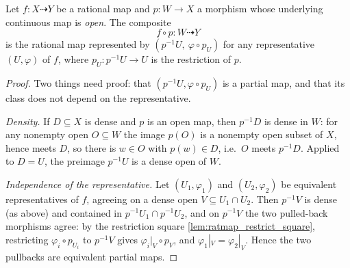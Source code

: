\begin{definition}
  \label{def:ratmap_precomp}
  \leanok
  Let \(f : X \dashrightarrow Y\) be a rational map and \(p : W \to X\) a
  morphism whose underlying continuous map is \emph{open}. The composite
  \[
    f \circ p : W \dashrightarrow Y
  \]
  is the rational map represented by \((p^{-1}U,\ \varphi \circ p_U)\) for any
  representative \((U, \varphi)\) of \(f\), where \(p_U : p^{-1}U \to U\) is the
  restriction of \(p\).
\end{definition}
\begin{proof}
  \leanok
  Two things need proof: that \((p^{-1}U, \varphi \circ p_U)\) is a partial map,
  and that its class does not depend on the representative.

  \emph{Density.} If \(D \subseteq X\) is dense and \(p\) is an open map, then
  \(p^{-1}D\) is dense in \(W\): for any nonempty open \(O \subseteq W\) the
  image \(p(O)\) is a nonempty open subset of \(X\), hence meets \(D\), so there
  is \(w \in O\) with \(p(w) \in D\), i.e.\ \(O\) meets \(p^{-1}D\). Applied to
  \(D = U\), the preimage \(p^{-1}U\) is a dense open of \(W\).

  \emph{Independence of the representative.} Let \((U_1, \varphi_1)\) and
  \((U_2, \varphi_2)\) be equivalent representatives of \(f\), agreeing on a
  dense open \(V \subseteq U_1 \cap U_2\). Then \(p^{-1}V\) is dense (as above)
  and contained in \(p^{-1}U_1 \cap p^{-1}U_2\), and on \(p^{-1}V\) the two
  pulled-back morphisms agree: by the restriction square
  \ref{lem:ratmap_restrict_square}, restricting \(\varphi_i \circ p_{U_i}\) to
  \(p^{-1}V\) gives \(\varphi_i|_V \circ p_V\), and \(\varphi_1|_V =
  \varphi_2|_V\). Hence the two pullbacks are equivalent partial maps.
\end{proof}

